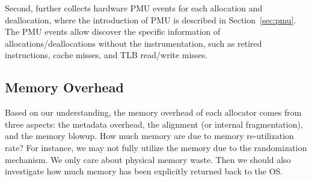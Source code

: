 Second, \MP{} further collects hardware PMU events for each allocation and deallocation, where the introduction of PMU is described in Section~\ref{sec:pmu}. The PMU events allow \MP{} discover the specific information of allocations/deallocations without the instrumentation, such as retired instructions, cache misses, and TLB read/write misses. 



\begin{comment}
Can we integrate the cache misses or page faults for each allocation and deallocation, so that we could identify the issue of DieHarder that invokes many unnecessary cache misses?

If we could correlate cache misses to each thread, then we could do this. 

If allocation and deallocation takes too much time, it could be caused by multiple reasons:

(1) First, it just takes a lot of instructions (could we find out the lapsed instructions for each thread?)
(2) It may be caused by not good algorithm? 
(3) It can be caused by lock contention?
(4) It can be caused by system call related contention?
\end{comment} 

\subsection{Memory Overhead}

Based on our understanding, the memory overhead of each allocator comes from three aspects: the metadata overhead, the alignment (or internal fragmentation), and the memory blowup. 
How much memory are due to memory re-utilization rate? For instance, we may not fully utilize the memory due to the randomization mechanism. We only care about physical memory waste. Then we should also investigate how much memory has been explicitly returned back to the OS. 

